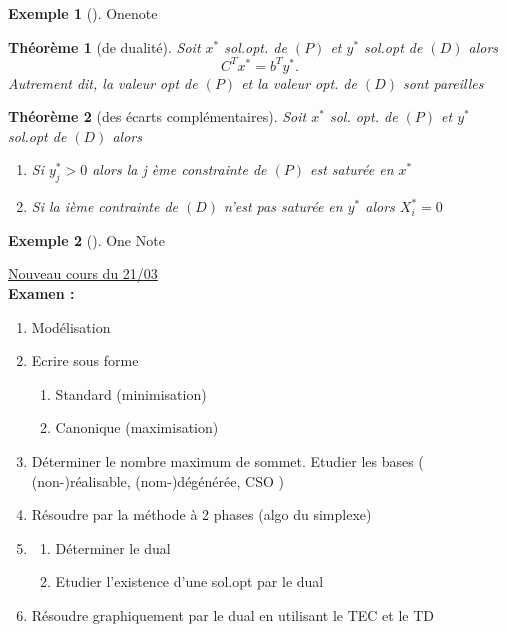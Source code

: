 \documentclass{article}
\theoremstyle{plain}%
\newtheorem{thm}{Théorème}[section]
\theoremstyle{definition}
\newtheorem{exmp}{Exemple}[section]
\theoremstyle{remark}
\begin{document}
\begin{exmp}[]
    Onenote
\end{exmp}

\begin{thm}[de dualité]
    Soit $ x^* $ sol.opt. de $ (P) $ et $ y^* $ sol.opt de $ (D) $ alors 
    \[
        C^T x^* = b^T y^*
    .\]
    Autrement dit, la valeur opt de $ (P) $ et la valeur opt. de $ (D) $ sont pareilles
\end{thm}

\begin{thm}[des écarts complémentaires]
    Soit $ x^* $ sol. opt. de $ (P) $ et $ y^* $ sol.opt de $ (D) $ alors \begin{enumerate}
        \item Si $ y_j^* >0 $ alors la j ème constrainte de $ (P) $ est saturée en $ x^* $ 
        \item Si la ième contrainte de $ (D) $ n'est pas saturée en $ y^* $ alors $ X_i^* = 0 $ 
    \end{enumerate}
\end{thm}

\begin{exmp}[]
    One Note
\end{exmp}

\underline{Nouveau cours du 21/03} \\

\textbf{Examen :}
\begin{enumerate}
    \item Modélisation 
    \item Ecrire sous forme \begin{enumerate}
        \item Standard (minimisation)
        \item Canonique (maximisation)
    \end{enumerate}
    \item Déterminer le nombre maximum de sommet. Etudier les bases ( (non-)réalisable, (nom-)dégénérée, CSO )
    \item Résoudre par la méthode à 2 phases (algo du simplexe)
    \item \begin{enumerate}
        \item Déterminer le dual
        \item Etudier l'existence d'une sol.opt par le dual
    \end{enumerate}
    \item Résoudre graphiquement par le dual en utilisant le TEC et le TD
\end{enumerate}
\end{document}
